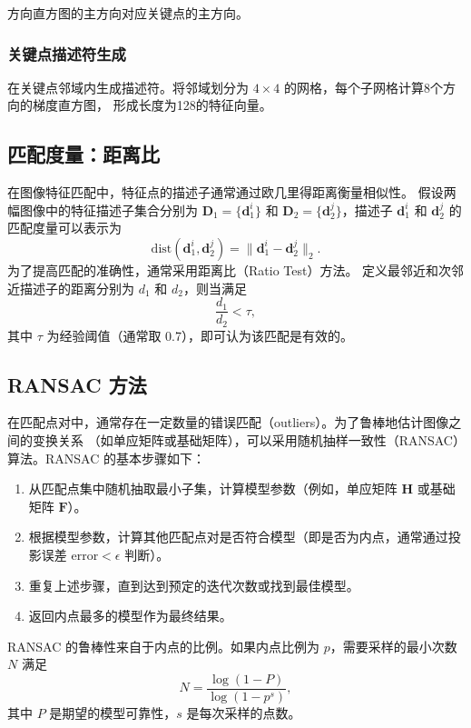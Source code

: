 \documentclass[12pt, a4paper, oneside]{ctexart}
\numberwithin{equation}{section}  %
\begin{document}
方向直方图的主方向对应关键点的主方向。

\subsubsection{关键点描述符生成}
在关键点邻域内生成描述符。将邻域划分为 \( 4 \times 4 \) 的网格，每个子网格计算8个方向的梯度直方图，
形成长度为128的特征向量。

\subsection{匹配度量：距离比}
在图像特征匹配中，特征点的描述子通常通过欧几里得距离衡量相似性。
假设两幅图像中的特征描述子集合分别为 $\mathbf{D}_1 = \{\mathbf{d}_1^i\}$ 和
$\mathbf{D}_2 = \{\mathbf{d}_2^j\}$，描述子 $\mathbf{d}_1^i$ 和
$\mathbf{d}_2^j$ 的匹配度量可以表示为
\[
\text{dist}(\mathbf{d}_1^i, \mathbf{d}_2^j) = \|\mathbf{d}_1^i - \mathbf{d}_2^j\|_2.
\]
为了提高匹配的准确性，通常采用距离比（Ratio Test）方法。
定义最邻近和次邻近描述子的距离分别为 $d_1$ 和 $d_2$，则当满足
\[
\frac{d_1}{d_2} < \tau,
\]
其中 $\tau$ 为经验阈值（通常取 0.7），即可认为该匹配是有效的。

\subsection{RANSAC 方法}
在匹配点对中，通常存在一定数量的错误匹配（outliers）。为了鲁棒地估计图像之间的变换关系
（如单应矩阵或基础矩阵），可以采用随机抽样一致性（RANSAC）算法。RANSAC 的基本步骤如下：
\begin{enumerate}
    \item 从匹配点集中随机抽取最小子集，计算模型参数（例如，单应矩阵 $\mathbf{H}$ 
    或基础矩阵 $\mathbf{F}$）。
    \item 根据模型参数，计算其他匹配点对是否符合模型（即是否为内点，通常通过投影误差 
    $\text{error} < \epsilon$ 判断）。
    \item 重复上述步骤，直到达到预定的迭代次数或找到最佳模型。
    \item 返回内点最多的模型作为最终结果。
\end{enumerate}
RANSAC 的鲁棒性来自于内点的比例。如果内点比例为 $p$，需要采样的最小次数 $N$ 满足
\[
N = \frac{\log(1 - P)}{\log(1 - p^s)},
\]
其中 $P$ 是期望的模型可靠性，$s$ 是每次采样的点数。
\end{document}
